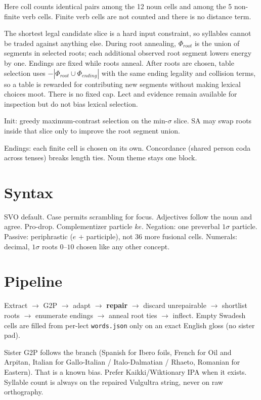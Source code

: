 \documentclass[12pt]{book}
\begin{document}
Here $\mathrm{coll}$ counts identical pairs among the 12 noun cells and
among the 5 non-finite verb cells. Finite verb cells are not counted and
there is no distance term.

The shortest legal candidate slice is a hard input constraint, so syllables
cannot be traded against anything else. During root annealing, $\Phi_{root}$
is the union of segments in selected roots; each additional observed root
segment lowers energy by one. Endings are fixed while roots anneal. After
roots are chosen, table selection uses $-|\Phi_{root}\cup\Phi_{ending}|$ with
the same ending legality and collision terms, so a table is
rewarded for contributing new segments without making lexical choices moot.
There is no fixed cap. Lect and evidence remain available for inspection but
do not bias lexical selection.

Init: greedy maximum-contrast selection on the min-$\sigma$ slice. SA may
swap roots inside that slice only to improve the root segment union.

Endings: each finite cell is chosen on its own. Concordance (shared
person coda across tenses) breaks length ties. Noun theme stays one
block.

\chapter{Syntax}

SVO default. Case permits scrambling for focus. Adjectives follow the
noun and agree. Pro-drop. Complementizer particle $ke$. Negation: one
preverbal $1\sigma$ particle. Passive: periphrastic ($e$ $+$
participle), not 36 more fusional cells. Numerals: decimal, $1\sigma$
roots $0$--$10$ chosen like any other concept.

\chapter{Pipeline}

Extract $\to$ G2P $\to$ adapt $\to$ \textbf{repair} $\to$ discard
unrepairable $\to$ shortlist roots $\to$ enumerate endings $\to$ anneal
root ties $\to$ inflect.
Empty Swadesh cells are filled from per-lect \texttt{words.json} only on
an exact English gloss (no sister pad).

Sister G2P follows the branch (Spanish for Ibero foils, French for Oil
and Arpitan, Italian for Gallo-Italian / Italo-Dalmatian / Rhaeto,
Romanian for Eastern). That is a known bias. Prefer Kaikki/Wiktionary
IPA when it exists. Syllable count is always on the repaired Vulgultra
string, never on raw orthography.
\end{document}
